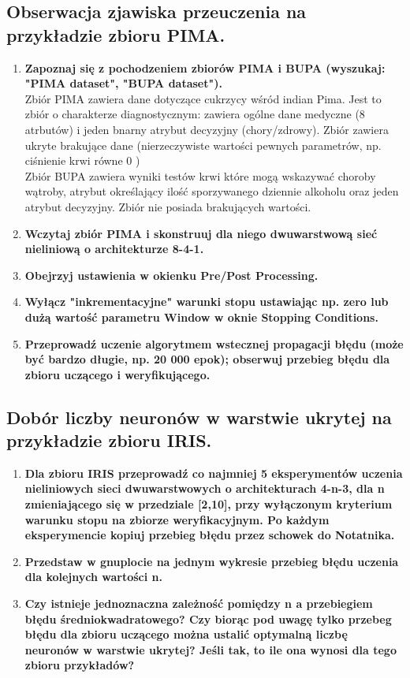 \subsection{Obserwacja zjawiska przeuczenia na przykładzie zbioru PIMA.}
\begin{enumerate}
\item \textbf{ Zapoznaj się z pochodzeniem zbiorów PIMA i BUPA (wyszukaj: "PIMA dataset", "BUPA dataset").}
\\Zbiór PIMA zawiera dane dotyczące cukrzycy wśród indian Pima. Jest to zbiór o charakterze diagnostycznym: zawiera ogólne dane medyczne (8 atrbutów) i jeden bnarny atrybut decyzyjny (chory/zdrowy). Zbiór zawiera ukryte brakujące dane (nierzeczywiste wartości pewnych parametrów, np. ciśnienie krwi równe 0 )
\\Zbiór BUPA zawiera wyniki testów krwi które mogą wskazywać choroby wątroby, atrybut określający ilość sporzywanego dziennie alkoholu oraz jeden atrybut decyzyjny. Zbiór nie posiada brakujących wartości.

\item \textbf{
Wczytaj zbiór PIMA i skonstruuj dla niego dwuwarstwową sieć nieliniową o architekturze 8-4-1.}

\item \textbf{
Obejrzyj ustawienia w okienku Pre/Post Processing.}

\item \textbf{
Wyłącz "inkrementacyjne" warunki stopu ustawiając np. zero lub dużą wartość parametru Window w oknie Stopping Conditions.}

\item \textbf{
Przeprowadź uczenie algorytmem wstecznej propagacji błędu (może być bardzo długie, np. 20 000 epok); obserwuj przebieg błędu dla zbioru uczącego i weryfikującego.}
\end{enumerate}

\subsection{Dobór liczby neuronów w warstwie ukrytej na przykładzie zbioru IRIS.}
\begin{enumerate}
\item \textbf{ Dla zbioru IRIS przeprowadź co najmniej 5 eksperymentów uczenia nieliniowych sieci dwuwarstwowych o architekturach 4-n-3, dla n zmieniającego się w przedziale [2,10], przy wyłączonym kryterium warunku stopu na zbiorze weryfikacyjnym. Po każdym eksperymencie kopiuj przebieg błędu przez schowek do Notatnika.}

\item \textbf{
Przedstaw w gnuplocie na jednym wykresie przebieg błędu uczenia dla kolejnych wartości n.}

\item \textbf{
Czy istnieje jednoznaczna zależność pomiędzy n a przebiegiem błędu średniokwadratowego? Czy biorąc pod uwagę tylko przebeg błędu dla zbioru uczącego można ustalić optymalną liczbę neuronów w warstwie ukrytej? Jeśli tak, to ile ona wynosi dla tego zbioru przykładów?}
\end{enumerate}

